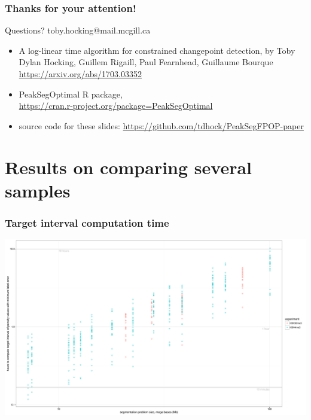 \documentclass{beamer}
\begin{document}

\begin{frame}
  \frametitle{Thanks for your attention!}

  Questions? toby.hocking@mail.mcgill.ca
  \begin{itemize}
  \item A log-linear time algorithm for constrained changepoint
    detection, by Toby Dylan Hocking, Guillem Rigaill, Paul Fearnhead,
    Guillaume Bourque \url{https://arxiv.org/abs/1703.03352}
  \item 
  PeakSegOptimal R package, \\
\url{https://cran.r-project.org/package=PeakSegOptimal}
  \item source code for these slides:
  \url{https://github.com/tdhock/PeakSegFPOP-paper}
  \end{itemize}
\end{frame}

\section*{Results on comparing several samples}

\begin{frame}
  \frametitle{Target interval computation time}
  \includegraphics[width=\textwidth]{figure-target-interval-time}
\end{frame}
\end{document}
